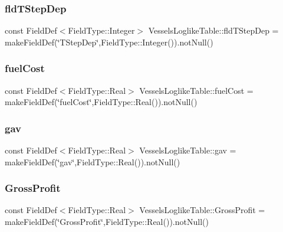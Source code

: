 \mbox{\label{class_vessels_loglike_table_acd43ce89ec5daacd7e0466b3cc1cdb0f}} 
\subsubsection{\texorpdfstring{fldTStepDep}{fldTStepDep}}
{\footnotesize\ttfamily const Field\+Def$<$Field\+Type\+::\+Integer$>$ Vessels\+Loglike\+Table\+::fld\+T\+Step\+Dep = make\+Field\+Def(\char`\"{}T\+Step\+Dep\char`\"{},Field\+Type\+::\+Integer()).not\+Null()}

\mbox{\label{class_vessels_loglike_table_a70b993e77dccb9480b878202103740e3}} 
\subsubsection{\texorpdfstring{fuelCost}{fuelCost}}
{\footnotesize\ttfamily const Field\+Def$<$Field\+Type\+::\+Real$>$ Vessels\+Loglike\+Table\+::fuel\+Cost = make\+Field\+Def(\char`\"{}fuel\+Cost\char`\"{},Field\+Type\+::\+Real()).not\+Null()}

\mbox{\label{class_vessels_loglike_table_a0803c6234d3c63dac832d2fb96c6af4e}} 
\subsubsection{\texorpdfstring{gav}{gav}}
{\footnotesize\ttfamily const Field\+Def$<$Field\+Type\+::\+Real$>$ Vessels\+Loglike\+Table\+::gav = make\+Field\+Def(\char`\"{}gav\char`\"{},Field\+Type\+::\+Real()).not\+Null()}

\mbox{\label{class_vessels_loglike_table_ab63228962ea8d0f6e05cd303a1ac917f}} 
\subsubsection{\texorpdfstring{GrossProfit}{GrossProfit}}
{\footnotesize\ttfamily const Field\+Def$<$Field\+Type\+::\+Real$>$ Vessels\+Loglike\+Table\+::\+Gross\+Profit = make\+Field\+Def(\char`\"{}Gross\+Profit\char`\"{},Field\+Type\+::\+Real()).not\+Null()}

